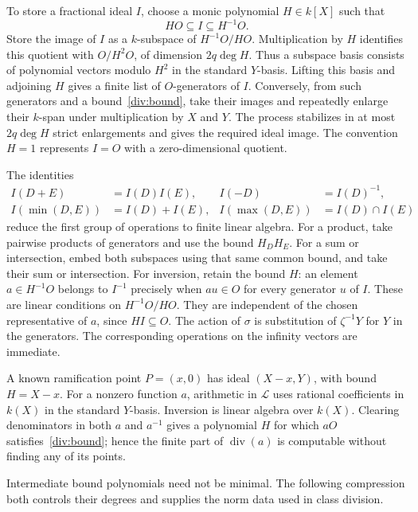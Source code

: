 To store a fractional ideal $I$, choose a monic polynomial $H\in k[X]$
such that
\begin{equation}\label{div:bound}
 HO\subseteq I\subseteq H^{-1}O.
\end{equation}
Store the image of $I$ as a $k$-subspace of $H^{-1}O/HO$.  Multiplication
by $H$ identifies this quotient with $O/H^2O$, of dimension $2q\deg H$.
Thus a subspace basis consists of polynomial vectors modulo $H^2$ in the
standard $Y$-basis.  Lifting this basis and adjoining $H$ gives a finite
list of $O$-generators of $I$.  Conversely, from such generators and a
bound~\eqref{div:bound}, take their images and repeatedly enlarge their
$k$-span under multiplication by $X$ and $Y$.  The process stabilizes in
at most $2q\deg H$ strict enlargements and gives the required ideal image.
The convention $H=1$ represents $I=O$ with a zero-dimensional quotient.

The identities
\begin{align*}
 I(D+E)&=I(D)I(E),& I(-D)&=I(D)^{-1},\\
 I(\min(D,E))&=I(D)+I(E),&
 I(\max(D,E))&=I(D)\cap I(E)
\end{align*}
reduce the first group of operations to finite linear algebra.  For a
product, take pairwise products of generators and use the bound $H_DH_E$.
For a sum or intersection, embed both subspaces using that same common
bound, and take their sum or intersection.  For inversion, retain the
bound $H$: an element $a\in H^{-1}O$ belongs to $I^{-1}$ precisely when
$au\in O$ for every generator $u$ of $I$.  These are linear conditions
on $H^{-1}O/HO$.  They are independent of the chosen representative of $a$,
since $HI\subseteq O$.  The action of $\sigma$ is substitution of
$\zeta^{-1}Y$ for $Y$ in the generators.  The corresponding operations on
the infinity vectors are immediate.

A known ramification point $P=(x,0)$ has ideal $(X-x,Y)$, with bound
$H=X-x$.  For a nonzero function $a$, arithmetic in $\mathcal L$ uses
rational coefficients in $k(X)$ in the standard $Y$-basis.  Inversion is
linear algebra over $k(X)$.  Clearing denominators in both $a$ and $a^{-1}$
gives a polynomial $H$ for which $aO$ satisfies~\eqref{div:bound}; hence
the finite part of $\operatorname{div}(a)$ is computable without finding
any of its points.

Intermediate bound polynomials need not be minimal.  The following
compression both controls their degrees and supplies the norm data used
in class division.

